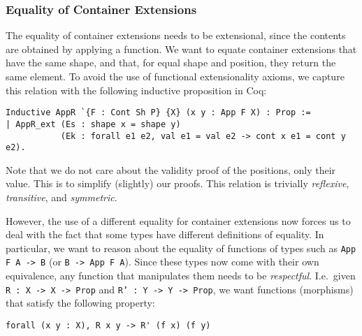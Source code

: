 \documentclass[a4paper, UKenglish, cleveref, autoref, thm-restate]{lipics-v2021}
\begin{document}
\subsubsection{Equality of Container Extensions}
The equality of container extensions needs to be extensional, since the
contents are obtained by applying a function. We want to equate container
extensions that have the same shape, and that, for equal shape and position,
they return the same element. To avoid the use of functional extensionality
axioms, we capture this relation with the following inductive proposition in
Coq:
\begin{verbatim}
Inductive AppR `{F : Cont Sh P} {X} (x y : App F X) : Prop :=
| AppR_ext (Es : shape x = shape y)
           (Ek : forall e1 e2, val e1 = val e2 -> cont x e1 = cont y e2).
\end{verbatim}
Note that  we do not care about the validity proof of the positions, only their
value. This is to simplify (slightly) our proofs. This relation is
trivially \emph{reflexive}, \emph{transitive}, and \emph{symmetric}.

However, the use of a different equality for container extensions now forces us
to deal with the fact that some types have different definitions of equality.
In particular, we want to reason about the equality of functions of types such
as \texttt{App F A -> B} (or \texttt{B -> App F A}). Since 
these types now come with their own equivalence, any function that manipulates
them needs to be \emph{respectful}. I.e.\ given 
\texttt{R : X -> X -> Prop} and \texttt{R' : Y -> Y -> Prop},
we want functions (morphisms) that satisfy the following property:
\begin{verbatim}
forall (x y : X), R x y -> R' (f x) (f y)
\end{verbatim}
\end{document}
